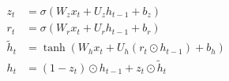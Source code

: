 \documentclass[12pt]{standalone}
\begin{document}
$\begin{aligned}
z_t &= \sigma(W_z x_t + U_z h_{t-1} + b_z)\\
r_t &= \sigma(W_r x_t + U_r h_{t-1} + b_r)\\
\tilde h_t &= \tanh(W_h x_t + U_h(r_t\odot h_{t-1}) + b_h)\\
h_t &= (1-z_t)\odot h_{t-1} + z_t\odot \tilde h_t
\end{aligned}$
\end{document}

